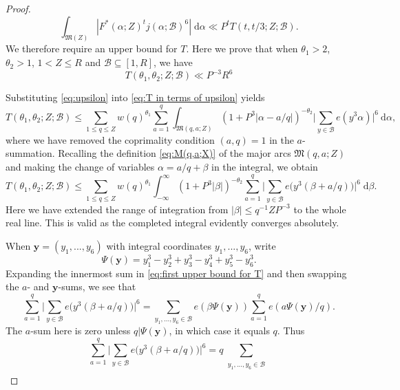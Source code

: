 \documentclass[12pt,english,reqno]{amsart}
\theoremstyle{definition}
\theoremstyle{remark}
\numberwithin{equation}{section}
\numberwithin{equation}{section}
\numberwithin{figure}{section}
\theoremstyle{plain}
\theoremstyle{plain}
\theoremstyle{plain}
\theoremstyle{plain}
\numberwithin{equation}{section}
\numberwithin{thm}{section}
\begin{document}
\begin{proof}
\begin{equation}
\int_{\mathfrak{M}(Z)}|F^*(\alpha;Z)^tj(\alpha;\mathcal{B})^6|\;\mathrm{d}\alpha\ll P^tT(t,t/3;Z;\mathcal{B}).\label{eq:integral of F*t in terms of upsilon}\end{equation}
We therefore require an upper bound for $T$. Here we prove that when $\theta_1>2$, $\theta_2>1$, $1<Z\leq R$ and $\mathcal{B}\subseteq[1,R]$, we have
\begin{equation}
T(\theta_1,\theta_2;Z;\mathcal{B})\ll P^{-3}R^6\label{eq:ultimate bound for T}\end{equation}
\par Substituting \eqref{eq:upsilon} into \eqref{eq:T in terms of upsilon}
yields
\[
T(\theta_1,\theta_2;Z;\mathcal{B})\leq\sum_{1\leq q\leq Z}w(q)^{\theta_1}\sum_{a=1}^{q}\int_{\mathfrak{M}(q,a;Z)}(1+P^{3}|\alpha-a/q|)^{-\theta_2}\Big|\sum_{y\in\mathcal{B}}e(y^{3}\alpha)\Big|^{6}\:\mathrm{d}\alpha,\]
where we have removed the coprimality condition $(a,q)=1$ in the
$a$-summation. Recalling the definition \eqref{eq:M(q,a;X)} of the
major arcs $\mathfrak{M}(q,a;Z)$ and making the change of variables
$\alpha=a/q+\beta$ in the integral, we obtain
\begin{equation}
T(\theta_1,\theta_2;Z;\mathcal{B})\leq\sum_{1\leq q\leq Z}w(q)^{\theta_1}\int_{-\infty}^{\infty}(1+P^3|\beta|)^{-\theta_2}\sum_{a=1}^{q}\Big|\sum_{y\in\mathcal{B}}e\Big(y^{3}(\beta+a/q)\Big)\Big|^{6}\;\mathrm{d}\beta.\label{eq:first upper bound for T}\end{equation}
Here we have extended the range of integration from $|\beta|\leq q^{-1}ZP^{-3}$
to the whole real line. This is valid as the completed integral evidently converges absolutely.
\par When $\boldsymbol{y}=(y_{1},...,y_{6})$
with integral coordinates $y_{1},...,y_{6}$, write
\begin{equation}
\Psi(\boldsymbol{y})=y_{1}^{3}-y_{2}^{3}+y_{3}^{3}-y_{4}^{3}+y_{5}^{3}-y_{6}^{3}.\label{eq:phi(y)}\end{equation}
Expanding the innermost sum in \eqref{eq:first upper bound for T}
and then swapping the $a$- and $\boldsymbol{y}$-sums, we see that 
\[
\sum_{a=1}^{q}\Big|\sum_{y\in\mathcal{B}}e\Big(y^{3}(\beta+a/q)\Big)\Big|^{6}=\sum_{y_{1},...,y_{6}\in\mathcal{B}}e(\beta\Psi(\boldsymbol{y}))\sum_{a=1}^{q}e(a\Psi(\boldsymbol{y})/q).\]
The $a$-sum here is zero unless $q|\Psi(\boldsymbol{y})$, in which
case it equals $q$. Thus
\begin{equation}
\sum_{a=1}^{q}\Big|\sum_{y\in\mathcal{B}}e\Big(y^{3}(\beta+a/q)\Big)\Big|^{6}=q\sum_{\substack{y_{1},...,y_{6}\in\mathcal{B}\\
}}
\end{equation}
\end{proof}
\end{document}
